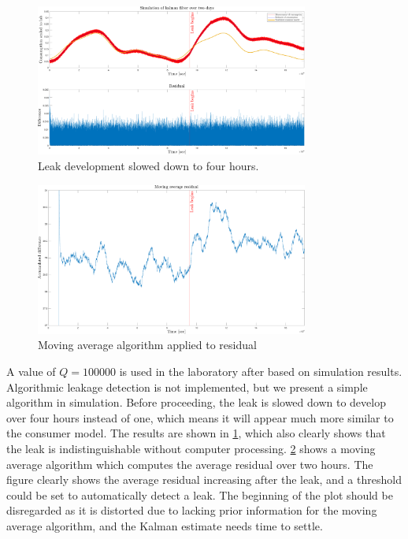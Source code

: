 \begin{figure}[h!]
	\centering
	\includegraphics[width=0.8\textwidth]{Pictures/Kalman_and_Residual_Q01_R100000_4hr.pdf}
	
	\caption{Leak development slowed down to four hours.}
	\label{fig:Kalman_and_Residual_Q01_R100000_4hr}
\end{figure}

\begin{figure}[h!]
	\centering
	\includegraphics[width=0.8\textwidth]{Pictures/MA_residual_Q01_R100000_AVRG4hr.pdf}
	
	\caption{Moving average algorithm applied to residual}
	\label{fig:Movingaverage}
\end{figure}

A value of $Q = 100000$ is used in the laboratory after based on simulation results. Algorithmic leakage detection is not implemented, but we present a simple algorithm in simulation. Before proceeding, the leak is slowed down to develop over four hours instead of one, which means it will appear much more similar to the consumer model. The results are shown in \cref{fig:Kalman_and_Residual_Q01_R100000_4hr}, which also clearly shows that the leak is indistinguishable without computer processing. \cref{fig:Movingaverage} shows a moving average algorithm which computes the average residual over two hours. The figure clearly shows the average residual increasing after the leak, and a threshold could be set to automatically detect a leak. The beginning of the plot should be disregarded as it is distorted due to lacking prior information for the moving average algorithm, and the Kalman estimate needs time to settle.

